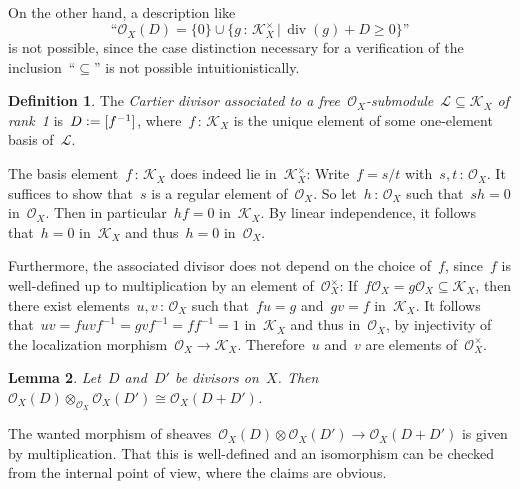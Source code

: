 \documentclass[10pt,reqno,a4paper]{amsbook}
\makeatletter
\theoremstyle{definition}
\newtheorem{defn}{Definition}[section]
\theoremstyle{plain}
\newtheorem{prop}[defn]{Proposition}
\newtheorem{lemma}[defn]{Lemma}
\theoremstyle{remark}
\renewcommand{\O}{\mathcal{O}}
\newcommand{\K}{\mathcal{K}}
\renewcommand{\L}{\mathcal{L}}
\newcommand{\?}{\,{:}\,}
\renewcommand{\_}{\mathpunct{.}\,}
\newcommand{\defeq}{\vcentcolon=}
\renewenvironment{proof}[1][\proofname]{\par
  \pushQED{\qed}%
  \normalfont \topsep6\p@\@plus6\p@\relax
  \trivlist
  \item[\hskip\labelsep
        \itshape
    #1\@addpunct{.}]\ignorespaces
}{%
  \popQED\endtrivlist\@endpefalse
}
\makeatother
\begin{document}
On the other hand, a description like
\[ \text{``$\O_X(D) = \{ 0 \} \cup \{ g \? \K_X^\times \,|\,
  \operatorname{div}(g) + D \geq 0 \}$''} \]
is not possible, since the case distinction necessary for a verification of the
inclusion~``$\subseteq$'' is not possible intuitionistically.


\begin{defn}The \emph{Cartier divisor associated to a free~$\O_X$-submodule~$\L \subseteq
\K_X$ of rank~1} is~$D \defeq [f^{-1}]$, where~$f\?\K_X$ is the unique element of
some one-element basis of~$\L$.\end{defn}

The basis element~$f\?\K_X$ does indeed lie in~$\K_X^\times$: Write~$f
= s/t$ with~$s,t \? \O_X$. It suffices to show that~$s$ is a regular element
of~$\O_X$. So let~$h\?\O_X$ such that~$sh = 0$ in~$\O_X$. Then in
particular~$hf = 0$ in~$\K_X$. By linear independence, it follows that~$h = 0$
in~$\K_X$ and thus~$h = 0$ in~$\O_X$.

Furthermore, the associated divisor does not depend on the choice of~$f$,
since~$f$ is well-defined up to multiplication by an element of~$\O_X^\times$: If~$f
\O_X = g \O_X \subseteq \K_X$, then there exist elements~$u,v\?\O_X$ such that~$fu = g$
and~$gv = f$ in~$\K_X$. It follows that~$uv = fuvf^{-1} = gvf^{-1} = ff^{-1} =
1$ in~$\K_X$ and thus in~$\O_X$, by injectivity of the localization morphism~$\O_X \to
\K_X$. Therefore~$u$ and~$v$ are elements of~$\O_X^\times$.

\begin{lemma}Let~$D$ and~$D'$ be divisors on~$X$. Then~$\O_X(D) \otimes_{\O_X}
\O_X(D') \cong \O_X(D + D')$.\end{lemma}
\begin{proof}The wanted morphism of sheaves~$\O_X(D) \otimes \O_X(D') \to
\O_X(D + D')$ is given by multiplication. That this is well-defined and an
isomorphism can be checked from the internal point of view, where the claims
are obvious.\end{proof}
\end{document}
